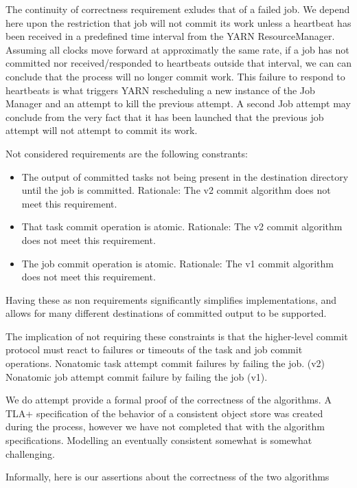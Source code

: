 \documentclass[conference]{IEEEtran}
\begin{document}
The continuity of correctness requirement exludes that of a failed job.
We depend here upon the restriction that job will not commit its work unless
a heartbeat has been received in a predefined time interval from the YARN ResourceManager.
Assuming all clocks move forward at approximatly the same rate, if a job has
not committed nor received/responded to heartbeats outside that interval,
we can can conclude that the process will no longer commit work.
This failure to respond to heartbeats is what triggers YARN rescheduling a new
instance of the Job Manager and an attempt to kill the previous attempt.
A second Job attempt may conclude from the very fact that it has been launched
that the previous job attempt will not attempt to commit its work.


Not considered requirements are the following constrants:

\begin{itemize}
  \item The output of committed tasks not being present in the destination directory
  until the job is committed.
  Rationale: The v2 commit algorithm does not meet this requirement.

  \item That task commit operation is atomic.
  Rationale: The v2 commit algorithm does not meet this requirement.

  \item The job commit operation is atomic.
  Rationale: The v1 commit algorithm does not meet this requirement.

\end{itemize}

Having these as non requirements significantly simplifies implementations,
and allows for many different destinations of committed output to be supported.

The implication of not requiring these constraints is that the higher-level
commit protocol must react to failures or timeouts of the task and job
commit operations.
Nonatomic task attempt commit failures by failing the job. (v2)
Nonatomic job attempt commit failure by failing the job (v1).


We do attempt provide a formal proof of the correctness of the algorithms.
A TLA+ specification of the behavior of a consistent object store was created
during the process, however we have not completed that with the algorithm specifications.
Modelling an eventually consistent somewhat is somewhat challenging.

Informally, here is our assertions about the correctness of the two algorithms
\end{document}
